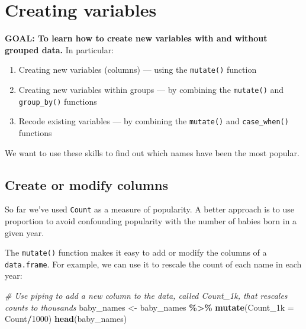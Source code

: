 \documentclass[
]{book}
\newenvironment{Shaded}{\begin{snugshade}}{\end{snugshade}}
\newcommand{\CommentTok}[1]{\textcolor[rgb]{0.56,0.35,0.01}{\textit{#1}}}
\newcommand{\DataTypeTok}[1]{\textcolor[rgb]{0.13,0.29,0.53}{#1}}
\newcommand{\DecValTok}[1]{\textcolor[rgb]{0.00,0.00,0.81}{#1}}
\newcommand{\KeywordTok}[1]{\textcolor[rgb]{0.13,0.29,0.53}{\textbf{#1}}}
\newcommand{\NormalTok}[1]{#1}
\newcommand{\OperatorTok}[1]{\textcolor[rgb]{0.81,0.36,0.00}{\textbf{#1}}}
\newcommand{\StringTok}[1]{\textcolor[rgb]{0.31,0.60,0.02}{#1}}
\providecommand{\tightlist}{%
  \setlength{\itemsep}{0pt}\setlength{\parskip}{0pt}}
\begin{document}
\hypertarget{creating-variables}{%
\section{Creating variables}\label{creating-variables}}

\begin{alert}

\textbf{GOAL: To learn how to create new variables with and without grouped data.} In particular:

\begin{enumerate}
\def\labelenumi{\arabic{enumi}.}
\tightlist
\item
  Creating new variables (columns) --- using the \texttt{mutate()} function
\item
  Creating new variables within groups --- by combining the \texttt{mutate()} and \texttt{group\_by()} functions
\item
  Recode existing variables --- by combining the \texttt{mutate()} and \texttt{case\_when()} functions
\end{enumerate}

\end{alert}

We want to use these skills to find out which names have been the most popular.

\hypertarget{create-or-modify-columns}{%
\subsection{Create or modify columns}\label{create-or-modify-columns}}

So far we've used \texttt{Count} as a measure of popularity. A better approach is to use proportion to avoid confounding popularity with the number of babies born in a given year.

The \texttt{mutate()} function makes it easy to add or modify the columns of a \texttt{data.frame}. For example, we can use it to rescale the count of each name in each year:

\begin{Shaded}
\begin{Highlighting}[]
\CommentTok{\# Use piping to add a new column to the data, called Count\_1k, that rescales counts to thousands}
\NormalTok{baby\_names \textless{}{-}}\StringTok{ }\NormalTok{baby\_names }\OperatorTok{\%\textgreater{}\%}\StringTok{ }\KeywordTok{mutate}\NormalTok{(}\DataTypeTok{Count\_1k =}\NormalTok{ Count}\OperatorTok{/}\DecValTok{1000}\NormalTok{)}
\KeywordTok{head}\NormalTok{(baby\_names) }
\end{Highlighting}
\end{Shaded}
\end{document}
